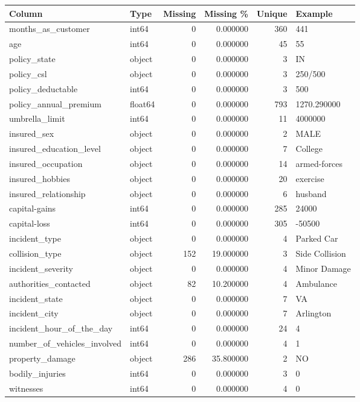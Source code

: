 \begin{tabular}{llrrrl}
\toprule
Column & Type & Missing & Missing \% & Unique & Example \\
\midrule
months\_as\_customer & int64 & 0 & 0.000000 & 360 & 441 \\
age & int64 & 0 & 0.000000 & 45 & 55 \\
policy\_state & object & 0 & 0.000000 & 3 & IN \\
policy\_csl & object & 0 & 0.000000 & 3 & 250/500 \\
policy\_deductable & int64 & 0 & 0.000000 & 3 & 500 \\
policy\_annual\_premium & float64 & 0 & 0.000000 & 793 & 1270.290000 \\
umbrella\_limit & int64 & 0 & 0.000000 & 11 & 4000000 \\
insured\_sex & object & 0 & 0.000000 & 2 & MALE \\
insured\_education\_level & object & 0 & 0.000000 & 7 & College \\
insured\_occupation & object & 0 & 0.000000 & 14 & armed-forces \\
insured\_hobbies & object & 0 & 0.000000 & 20 & exercise \\
insured\_relationship & object & 0 & 0.000000 & 6 & husband \\
capital-gains & int64 & 0 & 0.000000 & 285 & 24000 \\
capital-loss & int64 & 0 & 0.000000 & 305 & -50500 \\
incident\_type & object & 0 & 0.000000 & 4 & Parked Car \\
collision\_type & object & 152 & 19.000000 & 3 & Side Collision \\
incident\_severity & object & 0 & 0.000000 & 4 & Minor Damage \\
authorities\_contacted & object & 82 & 10.200000 & 4 & Ambulance \\
incident\_state & object & 0 & 0.000000 & 7 & VA \\
incident\_city & object & 0 & 0.000000 & 7 & Arlington \\
incident\_hour\_of\_the\_day & int64 & 0 & 0.000000 & 24 & 4 \\
number\_of\_vehicles\_involved & int64 & 0 & 0.000000 & 4 & 1 \\
property\_damage & object & 286 & 35.800000 & 2 & NO \\
bodily\_injuries & int64 & 0 & 0.000000 & 3 & 0 \\
witnesses & int64 & 0 & 0.000000 & 4 & 0 \\

\end{tabular}
